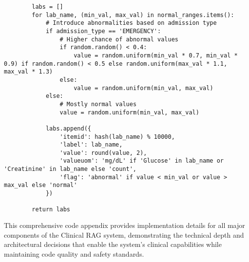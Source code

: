 \begin{verbatim}
        labs = []
        for lab_name, (min_val, max_val) in normal_ranges.items():
            # Introduce abnormalities based on admission type
            if admission_type == 'EMERGENCY':
                # Higher chance of abnormal values
                if random.random() < 0.4:
                    value = random.uniform(min_val * 0.7, min_val * 0.9) if random.random() < 0.5 else random.uniform(max_val * 1.1, max_val * 1.3)
                else:
                    value = random.uniform(min_val, max_val)
            else:
                # Mostly normal values
                value = random.uniform(min_val, max_val)
            
            labs.append({
                'itemid': hash(lab_name) % 10000,
                'label': lab_name,
                'value': round(value, 2),
                'valueuom': 'mg/dL' if 'Glucose' in lab_name or 'Creatinine' in lab_name else 'count',
                'flag': 'abnormal' if value < min_val or value > max_val else 'normal'
            })
        
        return labs
\end{verbatim}

This comprehensive code appendix provides implementation details for all major components of the Clinical RAG system, demonstrating the technical depth and architectural decisions that enable the system's clinical capabilities while maintaining code quality and safety standards.